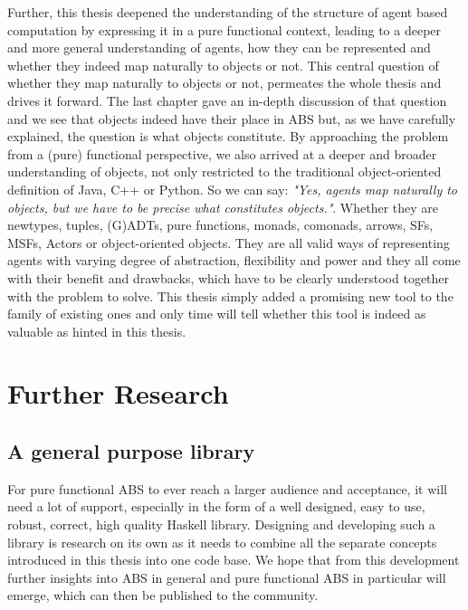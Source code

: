 Further, this thesis deepened the understanding of the structure of agent based computation by expressing it in a pure functional context, leading to a deeper and more general understanding of agents, how they can be represented and whether they indeed map naturally to objects or not. This central question of whether they map naturally to objects or not, permeates the whole thesis and drives it forward. The last chapter gave an in-depth discussion of that question and we see that objects indeed have their place in ABS but, as we have carefully explained, the question is what objects constitute. By approaching the problem from a (pure) functional perspective, we also arrived at a deeper and broader understanding of objects, not only restricted to the traditional object-oriented definition of Java, C++ or Python. So we can say: \textit{"Yes, agents map naturally to objects, but we have to be precise what constitutes objects."}. Whether they are newtypes, tuples, (G)ADTs, pure functions, monads, comonads, arrows, SFs, MSFs, Actors or object-oriented objects. They are all valid ways of representing agents with varying degree of abstraction, flexibility and power and they all come with their benefit and drawbacks, which have to be clearly understood together with the problem to solve. This thesis simply added a promising new tool to the family of existing ones and only time will tell whether this tool is indeed as valuable as hinted in this thesis.

\section{Further Research}
\subsection{A general purpose library}
For pure functional ABS to ever reach a larger audience and acceptance, it will need a lot of support, especially in the form of a well designed, easy to use, robust, correct, high quality Haskell library. Designing and developing such a library is research on its own as it needs to combine all the separate concepts introduced in this thesis into one code base. We hope that from this development further insights into ABS in general and pure functional ABS in particular will emerge, which can then be published to the community.


